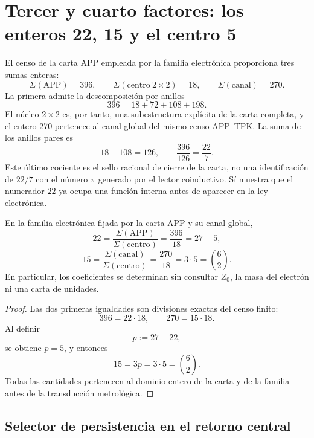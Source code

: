 \section{Tercer y cuarto factores: los enteros 22, 15 y el centro 5}

El censo de la carta APP empleada por la familia electrónica proporciona
tres sumas enteras:
\[
 \Sigma(\mathrm{APP})=396,
 \qquad
 \Sigma(\mathrm{centro}\ 2\times2)=18,
 \qquad
 \Sigma(\mathrm{canal})=270.
\]
La primera admite la descomposición por anillos
\[
 396=18+72+108+198.
\]
El núcleo \(2\times2\) es, por tanto, una subestructura explícita de la
carta completa, y el entero 270 pertenece al canal global del mismo censo
APP--TPK.
La suma de los anillos pares es
\[
 18+108=126,
 \qquad
 \frac{396}{126}=\frac{22}{7}.
\]
Este último cociente es el sello racional de cierre de la carta, no una
identificación de \(22/7\) con el número \(\pi\) generado por el lector
coinductivo. Sí muestra que el numerador \(22\) ya ocupa una función
interna antes de aparecer en la ley electrónica.

\begin{theorem}
\label{thm:coeficientes-electron-rev6}
En la familia electrónica fijada por la carta APP y su canal global,
\[
 \boxed{
 22=\frac{\Sigma(\mathrm{APP})}
 {\Sigma(\mathrm{centro})}
 =\frac{396}{18}=27-5,}
\]
\[
 \boxed{
 15=\frac{\Sigma(\mathrm{canal})}
 {\Sigma(\mathrm{centro})}
 =\frac{270}{18}=3\cdot5=\binom62.}
\]
En particular, los coeficientes se determinan sin consultar
\(Z_0\), la masa del electrón ni una carta de unidades.
\end{theorem}

\begin{proof}
Las dos primeras igualdades son divisiones exactas del censo finito:
\[
 396=22\cdot18,
 \qquad
 270=15\cdot18.
\]
Al definir
\[
 p:=27-22,
\]
se obtiene \(p=5\), y entonces
\[
 15=3p=3\cdot5=\binom62.
\]
Todas las cantidades pertenecen al dominio entero de la carta y de la
familia antes de la transducción metrológica.
\end{proof}

\subsection{Selector de persistencia en el retorno central}

